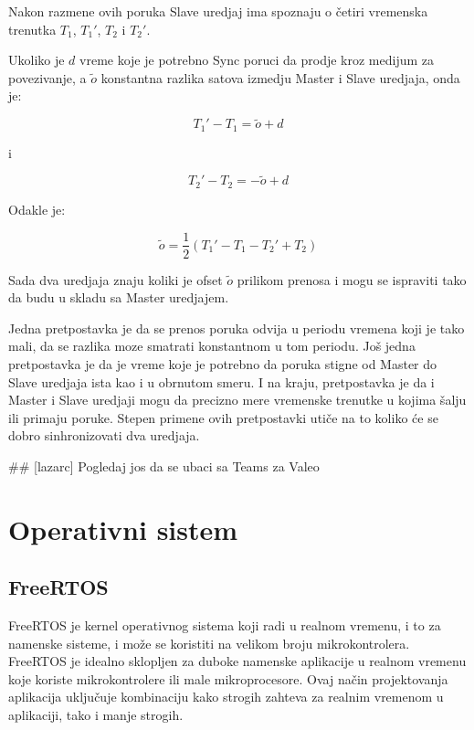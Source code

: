 \documentclass[a4paper,12pt, master]{etf}
\begin{document}
	Nakon razmene ovih poruka Slave uredjaj ima spoznaju o \v{c}etiri vremenska 
	trenutka $T_1$,	$T_1'$,	$T_2$ i $T_2'$.

	Ukoliko je $d$ vreme koje je potrebno Sync poruci da prodje kroz medijum za 
	povezivanje, a $\tilde{o}$ konstantna razlika satova izmedju Master i Slave 
	uredjaja, onda je:

	\begin{equation}
		T_1' - T_1 = \tilde{o} + d
	\end{equation}

	i

	\begin{equation}
			T_2' - T_2 = -\tilde{o} + d
	\end{equation}

	Odakle je:

	\begin{equation}
		\tilde{o} = \frac{1}{2} (T_1' - T_1 - T_2' + T_2)
	\end{equation}

	Sada dva uredjaja znaju koliki je ofset $\tilde{o}$ prilikom prenosa i mogu 
	se ispraviti tako da budu u skladu sa Master uredjajem.

	Jedna pretpostavka je da se prenos poruka odvija u periodu vremena koji je 
	tako mali, da se razlika moze smatrati konstantnom u tom periodu. Jo\v{s} 
	jedna pretpostavka je da je vreme koje je potrebno da poruka stigne od 
	Master do Slave uredjaja ista kao i u obrnutom smeru. I na kraju, 
	pretpostavka je da i Master i Slave uredjaji mogu da precizno mere 
	vremenske trenutke u kojima \v{s}alju ili primaju poruke. Stepen primene 
	ovih pretpostavki uti\v{c}e na to koliko \'{c}e se dobro sinhronizovati dva 
	uredjaja.

	\#\# [lazarc] Pogledaj jos da se ubaci sa Teams za Valeo

	\newpage

	\chapter{Operativni sistem}

	\section{FreeRTOS}

	FreeRTOS je kernel operativnog sistema koji radi u realnom vremenu, i to za 
	namenske sisteme, i mo\v{z}e se koristiti na velikom broju mikrokontrolera. 
	FreeRTOS je idealno sklopljen za duboke namenske aplikacije u realnom 
	vremenu koje koriste mikrokontrolere ili male mikroprocesore. Ovaj 
	na\v{c}in projektovanja aplikacija uklju\v{c}uje kombinaciju kako strogih 
	zahteva za realnim vremenom u aplikaciji, tako i manje strogih.
\end{document}
